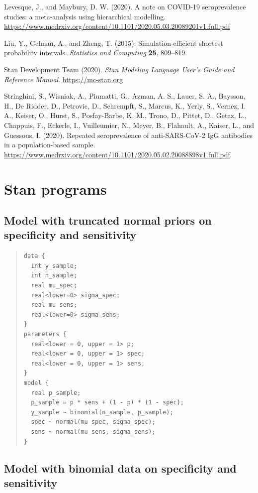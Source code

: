 \documentclass[11pt]{article}
\begin{document}
\bibitem Levesque, J., and Maybury, D. W. (2020).  A note on COVID-19 seroprevalence studies: a meta-analysis using hierarchical modelling.  \url{https://www.medrxiv.org/content/10.1101/2020.05.03.20089201v1.full.pdf}

\bibitem Liu, Y., Gelman, A., and Zheng, T. (2015).  Simulation-efficient shortest probability intervals. {\em Statistics and Computing} {\bf 25}, 809--819.

\bibitem Stan Development Team (2020). {\em Stan Modeling Language User's Guide and Reference Manual}.  \url{https://mc-stan.org}

\bibitem Stringhini, S., Wisniak, A., Piumatti, G., Azman, A. S., Lauer, S. A., Baysson, H., De Ridder, D., Petrovic, D.,  Schrempft, S., Marcus, K., Yerly, S., Vernez, I. A., Keiser, O., Hurst, S., Posfay-Barbe, K. M., Trono, D., Pittet, D., Getaz, L., Chappuis, F., Eckerle, I., Vuilleumier, N., Meyer, B., Flahault, A., Kaiser, L., and Guessous, I. (2020).  Repeated seroprevalence of anti-SARS-CoV-2 IgG antibodies in a population-based sample.  \url{https://www.medrxiv.org/content/10.1101/2020.05.02.20088898v1.full.pdf}

  \appendix

  \section{Stan programs}

  \subsection{Model with truncated normal priors on specificity and sensitivity}\label{stan1}

  \begin{small}
  \begin{quotation}\noindent
\begin{verbatim}
data {
  int y_sample;
  int n_sample;
  real mu_spec;
  real<lower=0> sigma_spec;
  real mu_sens;
  real<lower=0> sigma_sens;
}
parameters {
  real<lower = 0, upper = 1> p;
  real<lower = 0, upper = 1> spec;
  real<lower = 0, upper = 1> sens;
}
model {
  real p_sample;
  p_sample = p * sens + (1 - p) * (1 - spec);
  y_sample ~ binomial(n_sample, p_sample);
  spec ~ normal(mu_spec, sigma_spec);
  sens ~ normal(mu_sens, sigma_sens);
}
\end{verbatim}
\end{quotation}
\end{small}

  \subsection{Model with binomial data on specificity and sensitivity}\label{stan2}
\end{document}
